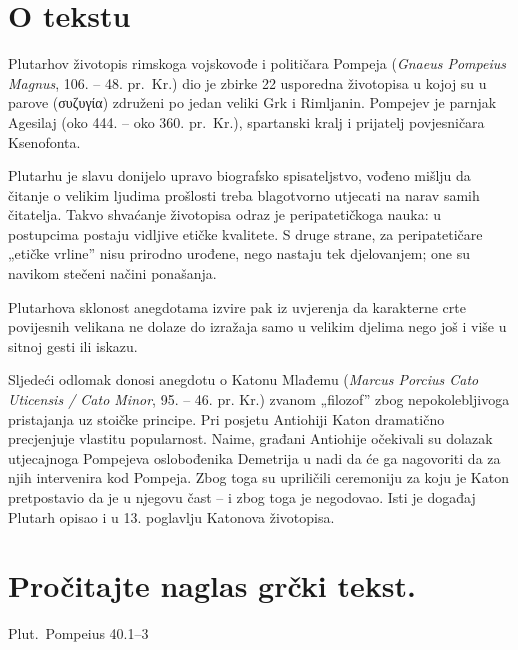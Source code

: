 

\section*{O tekstu}

Plutarhov životopis rimskoga vojskovođe i političara Pompeja (\textit{Gnaeus Pompeius Magnus}, 106. – 48. pr.~Kr.) dio je zbirke 22 usporedna životopisa u kojoj su u parove \textgreek[variant=ancient]{(συζυγία)} združeni po jedan veliki Grk i Rimljanin. Pompejev je parnjak Agesilaj (oko 444. – oko 360. pr.~Kr.), spartanski kralj i prijatelj povjesničara Ksenofonta. 

Plutarhu je slavu donijelo upravo biografsko spisateljstvo, vođeno mišlju da čitanje o velikim ljudima prošlosti treba blagotvorno utjecati na narav samih čitatelja. Takvo shvaćanje životopisa odraz je peripatetičkoga nauka: u postupcima postaju vidljive etičke kvalitete. S druge strane, za peripatetičare „etičke vrline'' nisu prirodno urođene, nego nastaju tek djelovanjem; one su navikom stečeni načini ponašanja. 

Plutarhova sklonost anegdotama izvire pak iz uvjerenja da karakterne crte povijesnih velikana ne dolaze do izražaja samo u velikim djelima nego još i više u sitnoj gesti ili iskazu. 

Sljedeći odlomak donosi anegdotu o Katonu Mlađemu (\textit{Marcus Porcius Cato Uticensis / Cato Minor}, 95. – 46. pr. Kr.) zvanom „filozof” zbog nepokolebljivoga pristajanja uz stoičke principe. Pri posjetu Antiohiji Katon dramatično precjenjuje vlastitu popularnost. Naime, građani Antiohije očekivali su dolazak utjecajnoga Pompejeva oslobođenika Demetrija u nadi da će ga nagovoriti da za njih intervenira kod Pompeja. Zbog toga su upriličili ceremoniju za koju je Katon pretpostavio da je u njegovu čast – i zbog toga je negodovao. Isti je događaj Plutarh opisao i u 13. poglavlju Katonova životopisa.


\section*{Pročitajte naglas grčki tekst.}

Plut.\ Pompeius 40.1–3


\medskip


